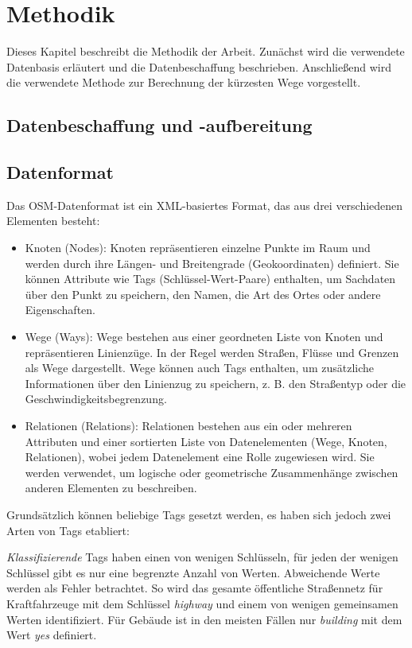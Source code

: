 \section{Methodik}
Dieses Kapitel beschreibt die Methodik der Arbeit. Zunächst wird die verwendete Datenbasis erläutert
und die Datenbeschaffung beschrieben. Anschließend wird die verwendete Methode zur Berechnung der
kürzesten Wege vorgestellt.

\subsection{Datenbeschaffung und -aufbereitung}

\subsection{Datenformat}
Das \ac{OSM}-Datenformat ist ein XML-basiertes Format, das aus drei verschiedenen Elementen besteht:
\begin{itemize}
    \item Knoten (Nodes): Knoten repräsentieren einzelne Punkte im Raum und werden durch ihre
          Längen- und Breitengrade (Geokoordinaten) definiert. Sie können Attribute wie Tags
          (Schlüssel-Wert-Paare) enthalten, um Sachdaten über den Punkt zu speichern, \zB den
          Namen, die Art des Ortes oder andere Eigenschaften.

    \item Wege (Ways): Wege bestehen aus einer geordneten Liste von Knoten und repräsentieren
          Linienzüge. In der Regel werden Straßen, Flüsse und Grenzen als Wege dargestellt. Wege
          können auch Tags enthalten, um zusätzliche Informationen über den Linienzug zu speichern,
          z. B. den Straßentyp oder die Geschwindigkeitsbegrenzung.

    \item Relationen (Relations): Relationen bestehen aus ein oder mehreren Attributen und einer
          sortierten Liste von Datenelementen (Wege, Knoten, Relationen), wobei  jedem Datenelement
          eine Rolle zugewiesen wird. Sie werden verwendet, um logische oder geometrische
          Zusammenhänge zwischen anderen Elementen zu beschreiben.
\end{itemize}
Grundsätzlich können beliebige Tags gesetzt werden, es haben sich jedoch zwei Arten von Tags
etabliert:

\emph{Klassifizierende} Tags haben einen von wenigen Schlüsseln, für jeden der wenigen Schlüssel
gibt es nur eine begrenzte Anzahl von Werten. Abweichende Werte werden als Fehler betrachtet. So
wird das gesamte öffentliche Straßennetz für Kraftfahrzeuge mit dem Schlüssel \emph{highway} und
einem von wenigen gemeinsamen Werten identifiziert. Für Gebäude ist in den meisten Fällen nur
\emph{building} mit dem Wert \emph{yes} definiert.

